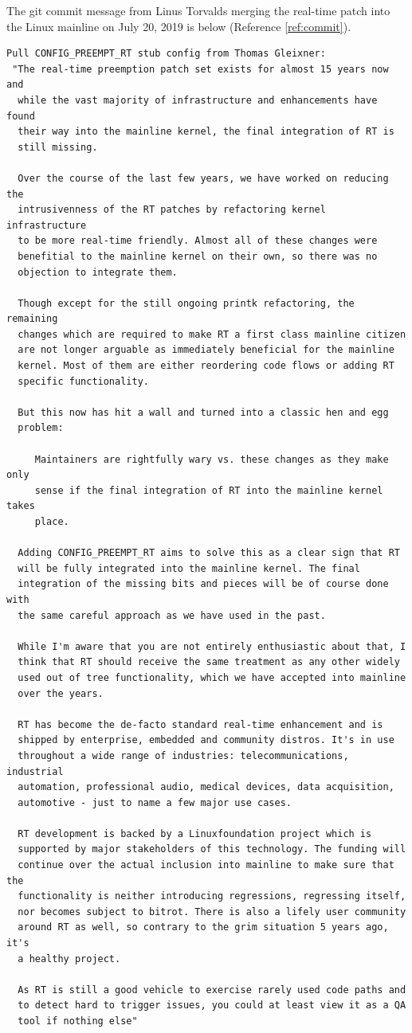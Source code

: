 \documentclass[12pt]{article}
\begin{document}
The git commit message from Linus Torvalds merging the real-time patch
into the Linux mainline on July 20, 2019 is below (Reference \ref{ref:commit}).

\begin{verbatim}
Pull CONFIG_PREEMPT_RT stub config from Thomas Gleixner:
 "The real-time preemption patch set exists for almost 15 years now and
  while the vast majority of infrastructure and enhancements have found
  their way into the mainline kernel, the final integration of RT is
  still missing.

  Over the course of the last few years, we have worked on reducing the
  intrusivenness of the RT patches by refactoring kernel infrastructure
  to be more real-time friendly. Almost all of these changes were
  benefitial to the mainline kernel on their own, so there was no
  objection to integrate them.

  Though except for the still ongoing printk refactoring, the remaining
  changes which are required to make RT a first class mainline citizen
  are not longer arguable as immediately beneficial for the mainline
  kernel. Most of them are either reordering code flows or adding RT
  specific functionality.

  But this now has hit a wall and turned into a classic hen and egg
  problem:

     Maintainers are rightfully wary vs. these changes as they make only
     sense if the final integration of RT into the mainline kernel takes
     place.

  Adding CONFIG_PREEMPT_RT aims to solve this as a clear sign that RT
  will be fully integrated into the mainline kernel. The final
  integration of the missing bits and pieces will be of course done with
  the same careful approach as we have used in the past.

  While I'm aware that you are not entirely enthusiastic about that, I
  think that RT should receive the same treatment as any other widely
  used out of tree functionality, which we have accepted into mainline
  over the years.

  RT has become the de-facto standard real-time enhancement and is
  shipped by enterprise, embedded and community distros. It's in use
  throughout a wide range of industries: telecommunications, industrial
  automation, professional audio, medical devices, data acquisition,
  automotive - just to name a few major use cases.

  RT development is backed by a Linuxfoundation project which is
  supported by major stakeholders of this technology. The funding will
  continue over the actual inclusion into mainline to make sure that the
  functionality is neither introducing regressions, regressing itself,
  nor becomes subject to bitrot. There is also a lifely user community
  around RT as well, so contrary to the grim situation 5 years ago, it's
  a healthy project.

  As RT is still a good vehicle to exercise rarely used code paths and
  to detect hard to trigger issues, you could at least view it as a QA
  tool if nothing else"
\end{verbatim}
\end{document}
